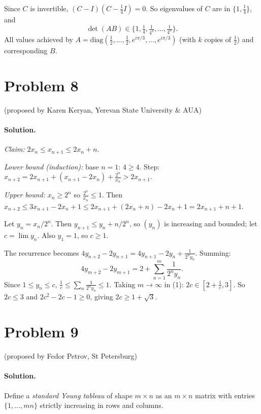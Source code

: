 \documentclass{article}
\begin{document}
Since $C$ is invertible, $(C-I)(C - \tfrac14 I) = 0$. So eigenvalues of $C$ are in $\{1, \tfrac14\}$, and
\[
\det(AB) \in \{1, \tfrac{1}{4}, \tfrac{1}{4^2}, \ldots, \tfrac{1}{4^n}\}.
\]
All values achieved by $A = \mathrm{diag}(\tfrac12, \ldots, \tfrac12, e^{i\pi/3}, \ldots, e^{i\pi/3})$ (with $k$ copies of $\tfrac12$) and corresponding $B$.

\section*{Problem 8}
(proposed by Karen Keryan, Yerevan State University \& AUA)

\paragraph{Solution.}
\emph{Claim:} $2 x_n \leq x_{n+1} \leq 2x_n + n$.

\emph{Lower bound (induction):} base $n=1$: $4 \geq 4$. Step: $x_{n+2} = 2 x_{n+1} + (x_{n+1} - 2x_n) + \frac{2^n}{x_n} > 2 x_{n+1}$.

\emph{Upper bound:} $x_n \geq 2^n$ so $\frac{2^n}{x_n} \leq 1$. Then $x_{n+2} \leq 3x_{n+1} - 2 x_n + 1 \leq 2 x_{n+1} + (2x_n + n) - 2x_n + 1 = 2 x_{n+1} + n + 1$.

Let $y_n = x_n/2^n$. Then $y_{n+1} \leq y_n + n/2^n$, so $(y_n)$ is increasing and bounded; let $c = \lim y_n$. Also $y_1 = 1$, so $c \geq 1$.

The recurrence becomes $4 y_{n+2} - 2 y_{n+1} = 4 y_{n+1} - 2 y_n + \frac{1}{2^n y_n}$. Summing:
\begin{equation}
4 y_{m+2} - 2 y_{m+1} = 2 + \sum_{n=1}^m \frac{1}{2^n y_n}. \tag{1}
\end{equation}
Since $1 \leq y_n \leq c$, $\frac{1}{c} \leq \sum_n \frac{1}{2^n y_n} \leq 1$. Taking $m \to \infty$ in (1): $2c \in [2 + \tfrac{1}{c}, 3]$. So $2c \leq 3$ and $2c^2 - 2c - 1 \geq 0$, giving $2c \geq 1 + \sqrt{3}$.

\section*{Problem 9}
(proposed by Fedor Petrov, St Petersburg)

\paragraph{Solution.}
Define a \emph{standard Young tableau} of shape $m \times n$ as an $m \times n$ matrix with entries $\{1, \ldots, mn\}$ strictly increasing in rows and columns.
\end{document}
